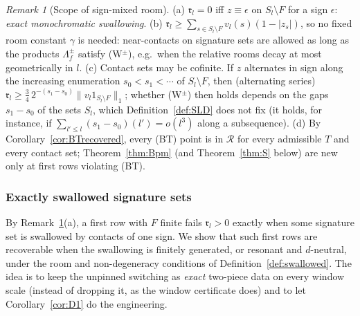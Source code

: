 \documentclass[10pt]{amsart}
\theoremstyle{definition}
\theoremstyle{remark}
\newtheorem{remark}[theorem]{Remark}
\newcommand{\Rec}{\mathcal R}
\begin{document}
\begin{remark}[Scope of sign-mixed room]\label{rem:Bpm}
(a) $\mathfrak r_l=0$ iff $z\equiv\epsilon$ on $S_l\setminus F$ for a sign
$\epsilon$: \emph{exact monochromatic swallowing}.  (b) $\mathfrak r_l\ge
\sum_{s\in S_l\setminus F}v_l(s)(1-|z_s|)$, so no fixed room constant
$\gamma$ is needed: near-contacts on signature sets are allowed as long as
the products $\Lambda^\pm_f$ satisfy (W$^\pm$), e.g.\ when the relative
rooms decay at most geometrically in $l$.  (c) Contact sets may be
cofinite.  If $z$ alternates in sign along the increasing enumeration
$s_0<s_1<\cdots$ of $S_l\setminus F$, then (alternating series)
$\mathfrak r_l\ge\frac34\,2^{-(s_1-s_0)}\|v_l1_{S_l\setminus F}\|_1$; whether
(W$^\pm$) then holds depends on the gaps $s_1-s_0$ of the sets $S_l$, which
Definition~\ref{def:SLD} does not fix (it holds, for instance, if
$\sum_{l'\le l}(s_1-s_0)(l')=o(l^3)$ along a subsequence).  (d) By
Corollary~\ref{cor:BTrecovered}, every \textup{(BT)} point is in $\Rec$
for every admissible $T$ and every contact set; Theorem~\ref{thm:Bpm} (and
Theorem~\ref{thm:S} below) are new only at first rows violating
\textup{(BT)}.
\end{remark}

\subsubsection*{Exactly swallowed signature sets}
By Remark~\ref{rem:Bpm}(a), a first row with $F$ finite fails
$\mathfrak r_l>0$ exactly when some signature set is swallowed by contacts
of one sign.  We show that such first rows are recoverable when the
swallowing is finitely generated, or resonant and $d$-neutral, under the
room and non-degeneracy conditions of Definition~\ref{def:swallowed}.  The idea
is to keep the unpinned switching as \emph{exact} two-piece data on every
window scale (instead of dropping it, as the window certificate does) and
to let Corollary~\ref{cor:D1} do the engineering.
\end{document}

